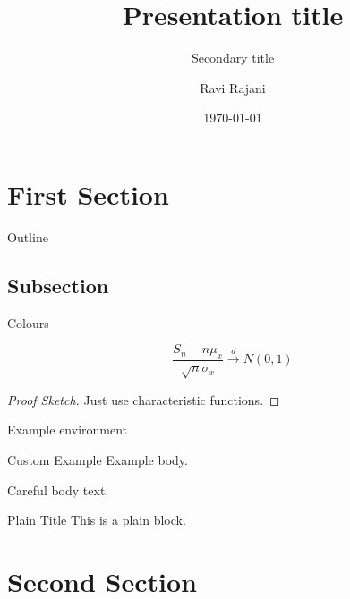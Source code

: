 \documentclass[11pt]{slides} %
\title{Presentation title}
\subtitle{Secondary title}
\author{Ravi Rajani}
\institute{Department of Mathematics}
\date{\today}
\begin{document}
\begin{frame}
  \titlepage
\end{frame}

\section{First Section}

\begin{frame}{Outline}
  \tableofcontents[currentsection]
\end{frame}

\subsection{Subsection}

\begin{frame}{Colours}
\begin{theorem}
\[
\frac{S_n - n\mu_x}{\sqrt{n}\sigma_x}\stackrel{d}{\to} N(0,1)
\]
\end{theorem}
\begin{proof}[Proof Sketch]
Just use characteristic functions.
\end{proof}
\begin{example}
Example environment
\end{example}\nointerlineskip%
\begin{minipage}{.5\textwidth}
  \begin{exampleblock}{Custom Example}
    Example body.
    \end{exampleblock}
\end{minipage}
\begin{alertblock}{Careful}
  body text.
\end{alertblock}
\begin{plainblock}{Plain Title}
This is a plain block.
\end{plainblock}
\end{frame}

\section{Second Section}
\end{document}
